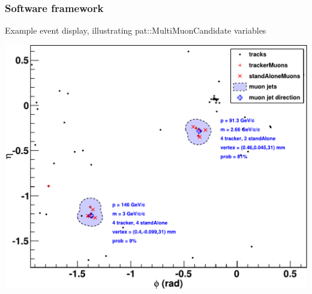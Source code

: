 \documentclass[compress]{beamer}
\begin{document}
\begin{frame}
\frametitle{Software framework}

\vfill
Example event display, illustrating pat::MultiMuonCandidate variables

\vfill
\includegraphics[width=0.85\linewidth]{example_event_display_3.pdf}
\end{frame}
\end{document}
